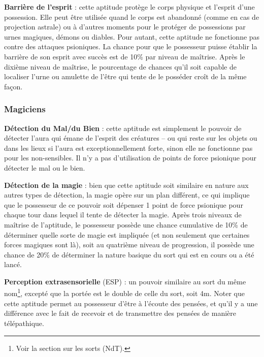 \documentclass[11pt]{article}
\begin{document}
{\bigskip

\textbf{Barrière de l'esprit} : cette aptitude protège le corps physique et l'esprit d'une possession. Elle peut être utilisée quand le corps est abandonné (comme en cas de projection astrale) ou à d'autres moments pour le protéger de possessions par urnes magiques, démons ou diables. Pour autant, cette aptitude ne fonctionne pas contre des attaques psioniques. La chance pour que le possesseur puisse établir la barrière de son esprit avec succès est de 10\% par niveau de maîtrise. Après le dixième niveau de maîtrise, le pourcentage de chances qu'il soit capable de localiser l'urne ou amulette de l'être qui tente de le posséder croît de la même façon.

\subsubsection*{Magiciens}

\textbf{Détection du Mal/du Bien} : cette aptitude est simplement le pouvoir de détecter l'aura qui émane de l'esprit des créatures -- ou qui reste sur les objets ou dans les lieux si l'aura est exceptionnellement forte, sinon elle ne fonctionne pas pour les non-sensibles.%
Il n'y a pas d'utilisation de points de force psionique pour détecter le mal ou le bien.

\bigskip

\textbf{Détection de la magie} : bien que cette aptitude soit similaire en nature aux autres types de détection, la magie opère sur un plan différent, ce qui implique que le possesseur de ce pouvoir soit dépenser 1 point de force psionique pour chaque tour dans lequel il tente de détecter la magie. Après trois niveaux de maîtrise de l'aptitude, le possesseur possède une chance cumulative de 10\% de déterminer quelle sorte de magie est impliquée (et non seulement que certaines forces magiques sont là), soit au quatrième niveau de progression, il possède une chance de 20\% de déterminer la nature basique du sort qui est en cours ou a été lancé.

\bigskip

\textbf{Perception extrasensorielle} (ESP) : un pouvoir similaire au sort du même nom\footnote{Voir la section sur les sorts (NdT).}, excepté que la portée est le double de celle du sort, soit 4m. Noter que cette aptitude permet au possesseur d'être \og à l'écoute \fg{} des pensées, et qu'il y a une différence avec le fait de recevoir et de transmettre des pensées de manière télépathique.

}
\end{document}
